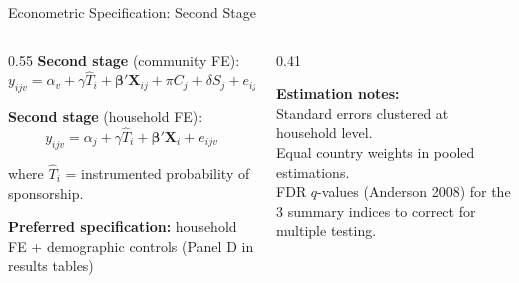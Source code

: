 \documentclass[aspectratio=169, 10pt]{beamer}
\begin{document}
\begin{frame}{Econometric Specification: Second Stage}
  \begin{columns}
    \begin{column}{0.55\textwidth}
      \textbf{Second stage} (community FE):
      \[
        y_{ijv} = \alpha_v + \gamma\widehat{T}_i + \boldsymbol{\beta}'\mathbf{X}_{ij} + \pi C_j + \delta S_j + e_{ijv}
      \]

      \textbf{Second stage} (household FE):
      \[
        y_{ijv} = \alpha_j + \gamma\widehat{T}_i + \boldsymbol{\beta}'\mathbf{X}_i + e_{ijv}
      \]

      \vspace{0.4em}
      where $\widehat{T}_i$ = instrumented probability of sponsorship.

      \vspace{0.4em}
      \textbf{Preferred specification:} household FE + demographic controls (Panel D in results tables)
    \end{column}
    \begin{column}{0.41\textwidth}
      \begin{methodbox}
        \textbf{Estimation notes:}\\[0.3em]
        Standard errors clustered at household level.\\[0.3em]
        Equal country weights in pooled estimations.\\[0.3em]
        FDR $q$-values (Anderson 2008) for the 3 summary indices to correct for multiple testing.
      \end{methodbox}
    \end{column}
  \end{columns}
\end{frame}
\end{document}
